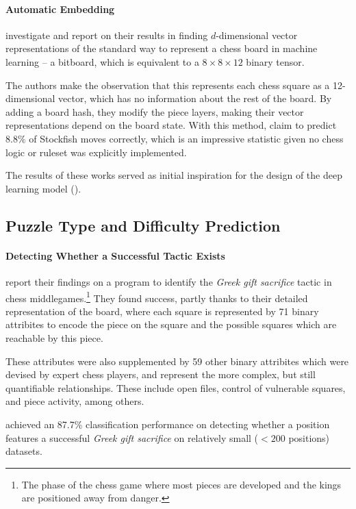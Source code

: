 \paragraph{Automatic Embedding}\citet{chess2vec} investigate and report on
their results in finding $d$-dimensional vector representations of the standard
way to represent a chess board in machine learning -- a bitboard, which is
equivalent to a $8\times8\times12$ binary tensor. 

The authors make the observation that this represents each chess square as a
12-dimensional vector, which has no information about the rest of the board. By
adding a board hash, they modify the piece layers, making their vector
representations depend on the board state. With this method, \citet{chess2vec}
claim to predict $8.8\%$ of Stockfish moves correctly, which is an impressive
statistic given no chess logic or ruleset was explicitly implemented.

The results of these works served as initial inspiration for the design of the
deep learning model ().

\subsection{Puzzle Type and Difficulty Prediction}

\paragraph{Detecting Whether a Successful Tactic
Exists}\citet{middleGamePatterns} report their findings on a program to
identify the \emph{Greek gift sacrifice} tactic in chess
middlegames.\footnote{The phase of the chess game where most pieces are
developed and the kings are positioned away from danger.} They found success,
partly thanks to their detailed representation of the board, where each square
is represented by 71 binary attribites \citep{middleGamePatterns} to encode the
piece on the square and the possible squares which are reachable by this piece. 

These attributes were also supplemented by 59 other binary attribites which
were devised by expert chess players, and represent the more complex, but still
quantifiable relationships. These include open files, control of vulnerable
squares, and piece activity, among others.

\citet{middleGamePatterns} achieved an 87.7\% classification performance on
detecting whether a position features a successful \emph{Greek gift sacrifice}
on relatively small ($<200$ positions) datasets. 

